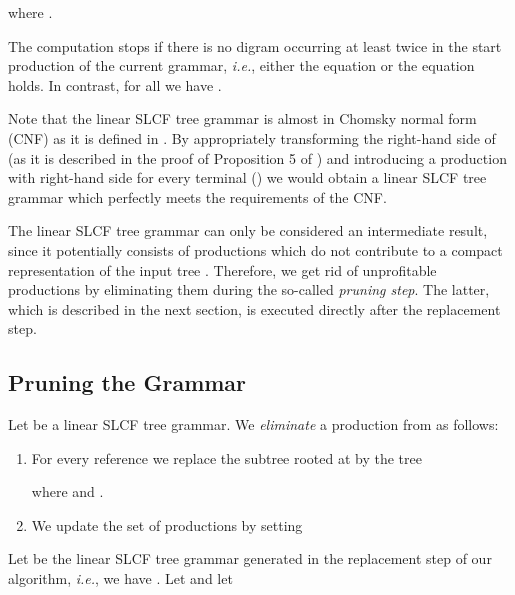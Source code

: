 \documentclass[12pt]{llncs}
\newcommand{\tp}{digram\xspace}
\newcommand{\hairsp}{\hspace{1pt}}\newcommand{\TODO}{\textcolor{red}{\bf TODO!}\xspace}
\newcommand{\ie}{\mbox{\textit{i.\hairsp{}e.}}\xspace}
\begin{document}
where .

The computation stops if there is no \tp  occurring at least twice in the start production of the current grammar, \ie, either the equation  or the equation  holds. In contrast, for all  we have .

Note that the linear SLCF tree grammar  is almost in Chomsky normal form (CNF) as it is defined in \cite{Lohrey09parameterreduction}. By appropriately transforming the right-hand side of  (as it is described in the proof of Proposition 5 of \cite{Lohrey09parameterreduction}) and introducing a production with right-hand side  for every terminal  () we would obtain a linear SLCF tree grammar which perfectly meets the requirements of the CNF.

The linear SLCF tree grammar  can only be considered an intermediate result, since it potentially consists of productions which do not contribute to a compact representation of the input tree . Therefore, we get rid of unprofitable productions by eliminating them during the so-called \emph{pruning step}. The latter, which is described in the next section, is executed directly after the replacement step.

\subsection{Pruning the Grammar}\label{sec:pruningStep}

Let  be a linear SLCF tree grammar. We \emph{eliminate} a production  from  as follows: 
	\begin{enumerate}[(1)]
		\item For every reference  we replace the subtree  rooted at  by the tree
			
			where  and . 
		\item We update the set of productions by setting 
			
	\end{enumerate}
Let  be the linear SLCF tree grammar generated in the replacement step of our algorithm, \ie, we have . Let  and let
\end{document}
